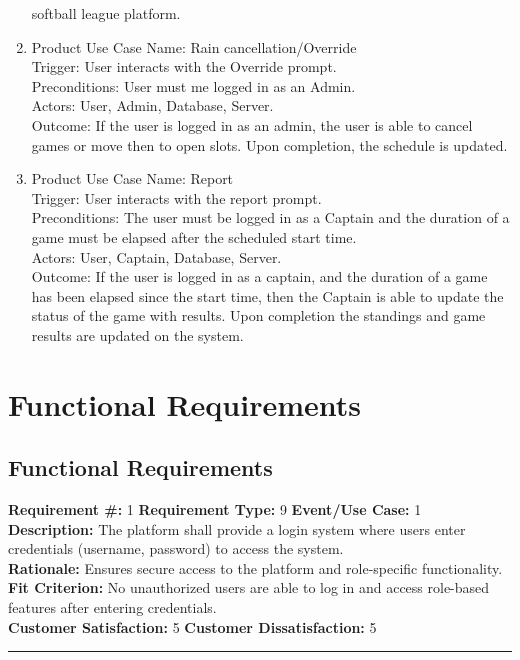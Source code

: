 \documentclass[12pt]{article}
\begin{document}
\begin{enumerate}
	softball league platform.
	\item Product Use Case Name: Rain cancellation/Override \\
	Trigger: User interacts with the Override prompt.\\
	Preconditions: User must me logged in as an Admin.\\
	Actors: User, Admin, Database, Server.\\
	Outcome: If the user is logged in as an admin, the user is able to cancel games or move then to open
	slots. Upon completion, the schedule is updated.
	\item Product Use Case Name: Report \\
	Trigger: User interacts with the report prompt.\\
	Preconditions: The user must be logged in as a Captain and the duration of a game must be elapsed after
	the scheduled start time.\\
	Actors: User, Captain, Database, Server.\\
	Outcome: If the user is logged in as a captain, and the duration of a game has been elapsed since the 
	start time, then the Captain is able to update the status of the game with results. Upon completion 
	the standings and game results are updated on the system.
\end{enumerate}


\section{Functional Requirements}
\subsection{Functional Requirements}
\textbf{Requirement \#:} 1 \quad \textbf{Requirement Type:} 9 \quad \textbf{Event/Use Case:} 1 \\
\textbf{Description:} The platform shall provide a login system where users enter credentials (username, password) to access the system.\\
\textbf{Rationale:} Ensures secure access to the platform and role-specific functionality.\\
\textbf{Fit Criterion:} No unauthorized users are able to log in and access role-based features after entering credentials.\\
\textbf{Customer Satisfaction:} 5 \quad\quad \textbf{Customer Dissatisfaction:} 5 \\
\noindent\rule{\textwidth}{1pt}
\end{document}
